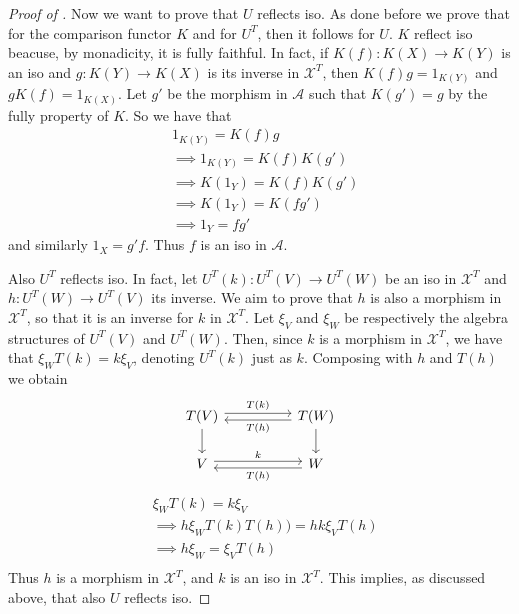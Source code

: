 \begin{subbox}{}
\begin{proof}[\textit{Proof of }]
    Now we want to prove that $U$ reflects iso. As done before we prove that for the comparison functor $K$ and for $U^T$, then it follows for $U$. $K$ reflect iso beacuse, by monadicity, it is fully faithful. In fact, if $K(f):K(X) \to K(Y)$ is an iso and $g: K(Y) \to K(X)$ is its inverse in $\mathcal{X}^T$, then $K(f)g=1_{K(Y)}$ and $gK(f)=1_{K(X)}$. Let $g'$ be the morphism in $\mathcal{A}$ such that $K(g') = g$ by the fully property of $K$. So we have that
    \begin{align*}
        &1_{K(Y)} = K(f)g\\[1.5ex]
        &\implies 1_{K(Y)} = K(f)K(g')\\[1.5ex]
        &\implies K(1_Y) = K(f)K(g')\\[1.5ex]
        &\implies K(1_Y) = K(fg')\\[1.5ex]
        &\implies 1_Y = fg'
    \end{align*}
    and similarly $1_X = g'f$. Thus $f$ is an iso in $\mathcal{A}$.

    Also $U^T$ reflects iso. In fact, let $U^T(k):U^T(V) \to U^T(W)$ be an iso in $\mathcal{X}^T$ and $h:U^T(W) \to U^T(V)$ its inverse. We aim to prove that $h$ is also a morphism in $\mathcal{X}^T$, so that it is an inverse for $k$ in $\mathcal{X}^T$. Let $\xi_V$ and $\xi_W$ be respectively the algebra structures of $U^T(V)$ and $U^T(W)$. Then, since $k$ is a morphism in $\mathcal{X}^T$, we have that $\xi_W T(k) = k \xi_V$, denoting $U^T(k)$ just as $k$. Composing with $h$ and $T(h)$ we obtain
    \[
\begin{tikzcd}
T(V) \arrow[d] \arrow[rr, "T(k)", shift left] &  & T(W) \arrow[d] \arrow[ll, "T(h)", shift left] \\
V \arrow[rr, "k", shift left]                 &  & W \arrow[ll, "T(h)", shift left]             
\end{tikzcd}
    \]
    \begin{align*}
        &\xi_W T(k) = k \xi_V\\[1.5ex]
        &\implies h \xi_W T(k) T(h)) = h k \xi_V T(h)\\[1.5ex]
        &\implies h \xi_W = \xi_V T(h)\\[1.5ex]
    \end{align*}
    Thus $h$ is a morphism in $\mathcal{X}^T$, and $k$ is an iso in $\mathcal{X}^T$. This implies, as discussed above, that also $U$ reflects iso.
    

\end{proof}
\end{subbox}
